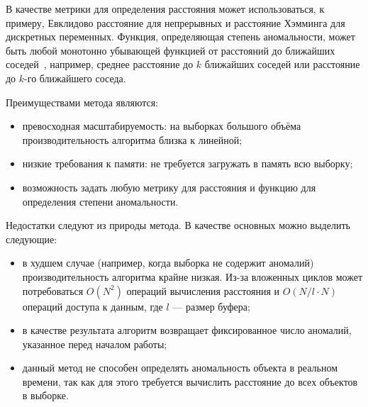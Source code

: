 В качестве метрики для определения расстояния может использоваться, к примеру, Евклидово расстояние для непрерывных и расстояние Хэмминга для дискретных переменных. Функция, определяющая степень аномальности, может быть любой монотонно убывающей функцией от расстояний до ближайших соседей~\cite{BaySchwabacherOrca}, например, среднее расстояние до $k$ ближайших соседей или расстояние до $k$-го ближайшего соседа.

Преимуществами метода являются:
\begin{itemize}
	\item превосходная масштабируемость: на выборках большого объёма производительность алгоритма близка к линейной;
	\item низкие требования к памяти: не требуется загружать в память всю выборку;
	\item возможность задать любую метрику для расстояния и функцию для определения степени аномальности.
\end{itemize}

Недостатки следуют из природы метода. В качестве основных можно выделить следующие:
\begin{itemize}
	\item в худшем случае (например, когда выборка не содержит аномалий) производительность алгоритма крайне низкая. Из-за вложенных циклов может потребоваться $O(N^2)$ операций вычисления расстояния и $O(N/l \cdot N)$ операций доступа к данным, где $l$ --- размер буфера;
	\item в качестве результата алгоритм возвращает фиксированное число аномалий, указанное перед началом работы;
	\item данный метод не способен определять аномальность объекта в реальном времени, так как для этого требуется вычислить расстояние до всех объектов в выборке.
\end{itemize}